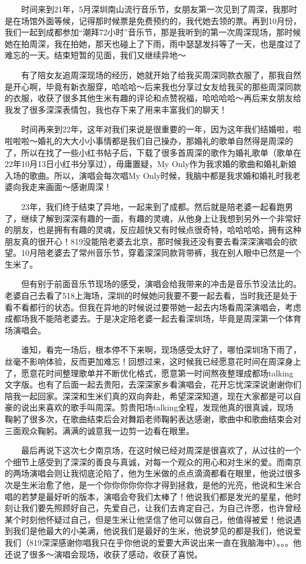 \documentclass[
]{book}
\begin{document}
  时间来到21年，5月深圳南山流行音乐节，女朋友第一次见到了周深，我那时是在场馆外面等候，记得那时候票是免费预约的，我代她去领的票。再到10月份，我们一起到成都参加``潮拜72小时''音乐节，那是我听到的第一次周深现场，那时候她在拍周深，我在拍她，那天也碰上了下雨，雨中瑟瑟发抖等了一天，也是度过了难忘的一天。结束短暂的见面，我们又继续异地～

  有了陪女友追周深现场的经历，她就开始了给我买周深同款衣服了，那我自然是开心啊，毕竟有新衣服穿，哈哈哈～后来我也分享过女友给我买的那些周深同款的衣服，收获了很多其他生米有趣的评论和点赞祝福，哈哈哈哈～再后来女朋友给我发了很多深深表情包，我也存下来了用来丰富我们的聊天！

  时间再来到22年，这年对我们来说是很重要的一年，因为这年我们结婚啦，啦啦啦啦～婚礼的大大小小事情都是我们自己操办，那婚礼的歌单自然得是周深的了，所以在找了一些小红书帖子后，下载了很多首周深的歌作为婚礼歌单（歌单在22年10月13日小红书分享过），毋庸置疑，My Only作为我求婚的歌曲和婚礼新娘入场的歌曲。所以，演唱会每次唱My Only时候，我脑中都是我求婚和婚礼时我老婆向我走来画面～感谢周深！

  23年，我们终于结束了异地，一起来到了成都。然后就是陪老婆一起看跑男了，继续了解到深深有趣的一面，有趣的灵魂，从他身上让我想到另外一个非常好的朋友，也是拥有有趣的灵魂，反应超快又有时候点很奇特，哈哈哈哈，拥有这种朋友真的很开心！819没能陪老婆去北京，那时候我还没有要去看深深演唱会的欲望。10月陪老婆去了常州音乐节，穿着深深同款背带裤，我在别人眼中已然是一个生米了。

  但有别于前面音乐节现场的感受，演唱会给我带来的冲击是音乐节没法比的。老婆自己去看了518上海场，深圳的时候她问我要不要一起去看，当时我还是处于看不看都行的状态。但我在异地的时候说过要带她一起去内场看周深演唱会，考虑成都场我不能陪老婆去。于是决定陪老婆一起去看深圳场，毕竟是周深第一个体育场演唱会。

  谁知，看完一场后，根本停不下来啊，现场感受太好了，哪怕深圳场下雨了，丝毫不影响体验，反而更加难忘！回想过来，这时候我已经愿意花时间在周深身上了，愿意花时间整理歌单并不断优化格式，愿意第一时间熬夜整理成都场talking文字版。也有了后面一起去贵阳，去深深家乡看演唱会，花开忘忧深深说谢谢你们陪我一起回家。深深和生米们真的双向奔赴，希望深深知道，现在大家都是可以自豪的说出来喜欢的歌手叫周深。剪贵阳场talking全程，发现他真的很真诚，现场鞠躬了很多次，在歌曲结束后会对舞蹈老师鞠躬表达感谢，歌曲中和歌曲结束会对三面观众鞠躬。满满的诚意我一边剪一边看在眼里。

  最后再说下这次七夕南京场，在这时候已经对周深是很喜欢了，从过往的一个个细节上感受到了深深的善良与真诚，对每一个观众的用心和对生米的爱。而南京的两场演唱会则让我彻底沦陷了，他为生米做的点点滴滴都看在眼里，他说过很多次是生米治愈了他，是一个你你你你你你才得到拯救，是他的光亮，他说和生米合唱的若梦是最好听的版本，演唱会夸我们太棒了！他说我们都是发光的星星，他时刻让我们要先照顾好自己，先爱自己，让我们去肯定自己，为自己许愿，也许曾经某个时刻他怀疑过自己，但是生米让他坚信了他可以做自己，他值得被爱！他说遇到我们是他最大的小美满，他说我们是最好的生米，他说梦见的都是我们，他说爱我们（819深深感谢你唱我只在乎你他说的爱要大声说出来一直在我脑海中）。。。他还说了很多～演唱会现场，收获了感动，收获了喜悦。
\end{document}
